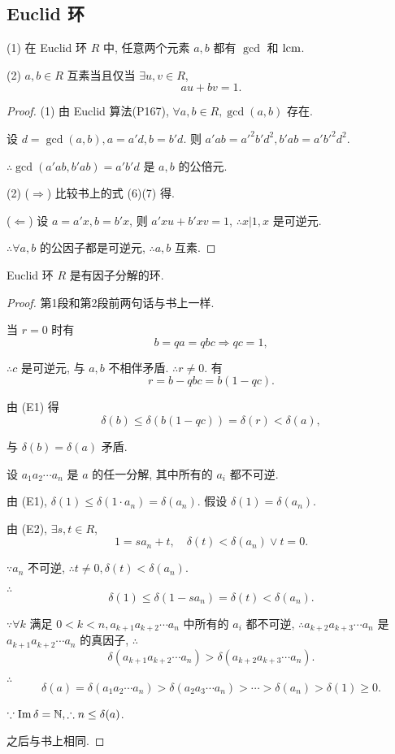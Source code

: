 \documentclass[color=black,device=normal,lang=cn,mode=geye]{elegantnote}
\begin{document}
\subsection{Euclid 环}
\begin{theorem}[书上的定理3]
    (1) 在 Euclid 环 $R$ 中, 任意两个元素 $a,b$ 都有 $\gcd$ 和 $\operatorname{lcm} $.

    (2) $a,b\in R$ 互素当且仅当 $\exists u,v\in R$,
    \[au+bv=1.\]
\end{theorem}
\begin{proof}
    (1) 由 Euclid 算法(P167), $\forall a,b\in R,\gcd(a,b)$ 存在.

    设 $d=\gcd(a,b),a=a'd,b=b'd$. 则 $a'ab=a'^2b'd^2,b'ab=a'b'^2d^2$.

    $\therefore\gcd(a'ab,b'ab)=a'b'd$ 是 $a,b$ 的公倍元.

    (2) ($\Rightarrow$) 比较书上的式 (6)(7) 得.

    ($\Leftarrow$) 设 $a=a'x,b=b'x$, 则 $a'xu+b'xv=1$, $\therefore x|1,x$ 是可逆元.

    $\therefore\forall a,b$ 的公因子都是可逆元, $\therefore a,b$ 互素.
\end{proof}
\begin{theorem}[书上的引理]\label{t3.2}
    Euclid 环 $R$ 是有因子分解的环.
\end{theorem}
\begin{proof}
    第1段和第2段前两句话与书上一样.

    当 $r=0$ 时有
    \[b=qa=qbc\Rightarrow qc=1,\]

    $\therefore c$ 是可逆元, 与 $a,b$ 不相伴矛盾. $\therefore r\neq0$. 有
    \[r=b-qbc=b(1-qc).\]

    由 (E1) 得
    \[\delta(b)\leq\delta(b(1-qc))=\delta(r)<\delta(a),\]
    
    与 $\delta(b)=\delta(a)$ 矛盾.

    设 $a_1a_2\cdots a_n$ 是 $a$ 的任一分解, 其中所有的 $a_i$ 都不可逆.

    由 (E1), $\delta(1)\leq\delta(1\cdot a_n)=\delta(a_n)$. 假设 $\delta(1)=\delta(a_n)$.

    由 (E2), $\exists s,t\in R$,
    \[1=sa_n+t,\quad\delta(t)<\delta(a_n)\vee t=0.\]

    $\because a_n$ 不可逆, $\therefore t\neq0,\delta(t)<\delta(a_n)$.

    $\therefore$
    \[\delta(1)\leq\delta(1-sa_n)=\delta(t)<\delta(a_n).\]

    $\because\forall k$ 满足 $0<k<n,a_{k+1}a_{k+2}\cdots a_n$ 中所有的 $a_i$ 都不可逆, $\therefore a_{k+2}a_{k+3}\cdots a_n$ 是 $a_{k+1}a_{k+2}\cdots a_n$ 的真因子, $\therefore$
    \[\delta(a_{k+1}a_{k+2}\cdots a_n)>\delta(a_{k+2}a_{k+3}\cdots a_n).\]

    $\therefore$
    \[\delta(a)=\delta(a_1a_2\cdots a_n)>\delta(a_2a_3\cdots a_n)>\cdots>\delta(a_n)>\delta(1)\geq0.\]

    $\because\operatorname{Im} \delta=\mathbb{N},\therefore n\leq\delta(a)$.

    之后与书上相同.
\end{proof}
\end{document}

